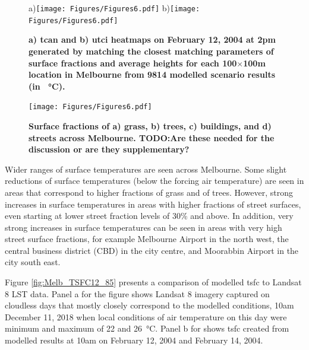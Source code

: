 \documentclass[final,3p,times,authoryear]{elsarticle}
\begin{document}
\begin{figure}
\centering
a)\texttt{[image: Figures/Figures6.pdf]}
b)\texttt{[image: Figures/Figures6.pdf]}
\caption{\bf a) \gls{tcan} and b) \gls{utci} heatmaps on February 12, 2004 at 2pm generated by matching the closest matching parameters of surface fractions and average heights for each 100$\times$100m location in Melbourne from 9814 modelled scenario results (in \SI{}{\degreeCelsius}). }
 \label{fig:TaMelb}  \label{fig:utciMelb}
\end{figure}

\begin{figure}
\centering
\texttt{[image: Figures/Figures6.pdf]}
\caption{\bf Surface fractions of a) grass, b) trees, c) buildings, and d) streets across Melbourne. TODO:Are these needed for the discussion or are they supplementary?}
 \label{fig:melfracs}
\end{figure}


Wider ranges of surface temperatures are seen across Melbourne. Some slight reductions of surface temperatures (below the forcing air temperature) are seen in areas that correspond to higher fractions of grass and of trees. However, strong increases in surface temperatures in areas with higher fractions of street surfaces, even starting at lower street fraction levels of 30\% and above.  In addition, very strong increases in surface temperatures can be seen in areas with very high street surface fractions, for example Melbourne Airport in the north west, the central business district (CBD) in the city centre, and Moorabbin Airport in the city south east.

Figure \ref{fig:Melb_TSFC12_85} presents a comparison of modelled \gls{tsfc} to Landsat 8 LST data. Panel a for the figure shows Landsat 8 imagery captured on cloudless days that mostly closely correspond to the modelled conditions, 10am December 11, 2018 when local conditions of air temperature on this day were minimum and maximum of 22 and 26\SI{}{\degreeCelsius}. Panel b for shows \gls{tsfc} created from modelled results at 10am on February 12, 2004 and February 14, 2004. 
\end{document}
